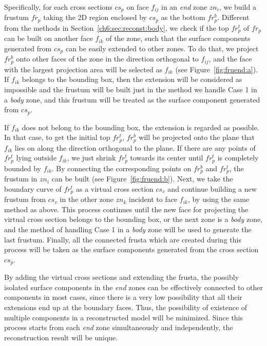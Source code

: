 Specifically, for  each cross sections $cs_p$ on face $f_{ij}$ in an
\textit{end} zone $zn_i$, we build a frustum $fr_p$ taking the 2D
region enclosed by $cs_p$ as the bottom $fr_p^b$. Different from the
methods in Section~\ref{ch6:sec:reconst:body}, we check if the top
$fr_p^t$ of $fr_p$ can be built on another face $f_{ik}$ of the
zone, such that the surface components generated from $cs_p$ can be
easily extended to other zones. To do that, we project $fr_p^b$ onto
other faces of the zone in the direction orthogonal to $f_{ij}$, and
the face with the largest projection area will be selected as
$f_{ik}$ (see Figure~\ref{fig:fruend:a}). If $f_{ik}$ belongs to the
bounding box, then the extension will be considered as impossible
and the frustum will be built just in the method we handle Case 1 in
a \textit{body} zone, and this frustum will be treated as the
surface component generated from $cs_p$.

If $f_{ik}$ does not belong to the bounding box, the extension is
regarded as possible. In that case, to get the initial top $fr_p^t$,
$fr_p^b$ will be projected onto the plane that $f_{ik}$ lies on
along the direction orthogonal to the plane. If there are any points
of $fr_p^t$ lying outside $f_{ik}$, we just shrink $fr_p^t$ towards
its center until $fr_p^t$ is completely bounded by $f_{ik}$. By
connecting the corresponding points on $fr_p^b$ and $fr_p^t$, the
frustum in $zn_i$ can be built (see Figure~\ref{fig:fruend:b}).
Next, we take the boundary curve of $fr_p^t$ as a virtual cross
section $cs_v$ and continue building a new frustum from $cs_v$ in
the other zone $zn_k$ incident to face $f_{ik}$, by using the same
method as above. This process continues until the new face for
projecting the virtual cross section belongs to the bounding box, or
the next zone is a \textit{body} zone, and the method of handling
Case 1 in a \textit{body} zone will be used to generate the last
frustum. Finally, all the connected frusta which are created during
this process will be taken as the surface components generated from
the cross section $cs_p$.

By adding the  virtual cross sections and extending the frusta, the
possibly isolated surface components in the \textit{end} zones can
be effectively connected to other components in most cases, since
there is a very low possibility that all their extensions end up at
the boundary faces. Thus, the possibility of existence of multiple
components in a reconstructed model will be minimized. Since this
process starts from each \textit{end} zone simultaneously and
independently, the reconstruction result will be unique.

